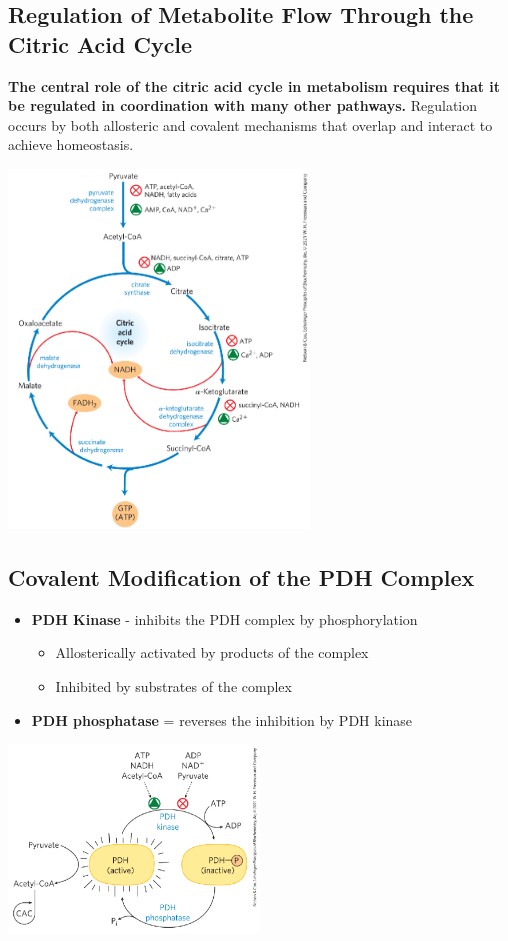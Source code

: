 \documentclass[10pt]{article}
\begin{document}
\subsection*{Regulation of Metabolite Flow Through the Citric Acid Cycle}
\textbf{The central role of the citric acid cycle in metabolism requires that it be regulated in coordination with many other pathways.}  Regulation occurs by both allosteric and covalent mechanisms that overlap and interact to achieve homeostasis.
\begin{center} 
	\includegraphics*[width=0.6\textwidth]{L1_1.png}
\end{center}

\subsection*{Covalent Modification of the PDH Complex}
\begin{itemize}
	\item \textbf{PDH Kinase} - inhibits the PDH complex by phosphorylation
	\begin{itemize}
        \item Allosterically activated by products of the complex
        \item Inhibited by substrates of the complex
    \end{itemize}
    \item \textbf{PDH phosphatase} = reverses the inhibition by PDH kinase
\end{itemize}
\begin{center} 
	\includegraphics*[width=0.5\textwidth]{L1_2}
\end{center}
\end{document}
